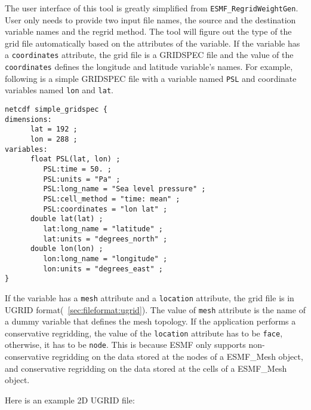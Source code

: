 The user interface of this tool is greatly simplified from {\tt ESMF\_RegridWeightGen}.  User only 
needs to provide two input file names, the source and the destination variable names and the regrid method.  The tool will figure out the type of the grid file automatically based on the attributes of the variable.
If the variable has a {\tt coordinates} attribute, the grid file is a GRIDSPEC file and the value of the 
{\tt coordinates} defines the longitude and latitude variable's names.  For example, following is a simple
GRIDSPEC file with a variable named {\tt PSL} and coordinate variables named {\tt lon} and {\tt lat}.

\label{gridspecexample}
\begin{verbatim}
netcdf simple_gridspec {
dimensions:
      lat = 192 ;
      lon = 288 ;
variables:
      float PSL(lat, lon) ;
         PSL:time = 50. ;
         PSL:units = "Pa" ;
         PSL:long_name = "Sea level pressure" ;
         PSL:cell_method = "time: mean" ;
         PSL:coordinates = "lon lat" ;
      double lat(lat) ;
         lat:long_name = "latitude" ;
         lat:units = "degrees_north" ;
      double lon(lon) ;
         lon:long_name = "longitude" ;
         lon:units = "degrees_east" ;
}
\end{verbatim}

If the variable has a {\tt mesh} attribute and a {\tt location} attribute, the grid file is in UGRID 
format(~\ref{sec:fileformat:ugrid}).  The value of {\tt mesh} attribute is the name of a dummy variable that defines the mesh topology.  If the application performs a conservative regridding, the value of the {\tt location} attribute has to be {\tt face}, otherwise, it has to be {\tt node}.  
This is because ESMF only supports non-conservative regridding on the data stored at the nodes of a ESMF\_Mesh object, and conservative regridding on the data stored at the cells of
a ESMF\_Mesh object.

Here is an example 2D UGRID file:

